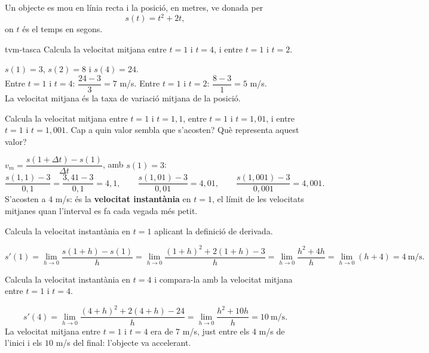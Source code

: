 Un objecte es mou en línia recta i la posició, en metres, ve donada per
\[
s(t)=t^2+2t ,
\]
on $t$ és el temps en segons.

\begin{apartats}

\begin{tria}{tvm-tasca}
Calcula la velocitat mitjana entre $t=1$ i $t=4$, i entre $t=1$ i $t=2$.

\begin{solucio}
$s(1)=3$, $s(2)=8$ i $s(4)=24$.\\
Entre $t=1$ i $t=4$: $\dfrac{24-3}{3}=7$ m/s. \quad Entre $t=1$ i $t=2$:
$\dfrac{8-3}{1}=5$ m/s.\\
La velocitat mitjana és la taxa de variació mitjana de la posició.
\end{solucio}

Calcula la velocitat mitjana entre $t=1$ i $t=1{,}1$, entre $t=1$ i $t=1{,}01$, i entre $t=1$ i
$t=1{,}001$. Cap a quin valor sembla que s'acosten? Què representa aquest valor?

\begin{solucio}
$v_m=\dfrac{s(1+\Delta t)-s(1)}{\Delta t}$, amb $s(1)=3$:
\[
\frac{s(1{,}1)-3}{0{,}1}=\frac{3{,}41-3}{0{,}1}=4{,}1,\qquad
\frac{s(1{,}01)-3}{0{,}01}=4{,}01,\qquad
\frac{s(1{,}001)-3}{0{,}001}=4{,}001 .
\]
S'acosten a $4$ m/s: és la \textbf{velocitat instantània} en $t=1$, el límit de les velocitats
mitjanes quan l'interval es fa cada vegada més petit.
\end{solucio}
\end{tria}

Calcula la velocitat instantània en $t=1$ aplicant la definició de derivada.

\begin{solucio}
\[
s'(1)=\lim_{h\to0}\frac{s(1+h)-s(1)}{h}
=\lim_{h\to0}\frac{(1+h)^2+2(1+h)-3}{h}
=\lim_{h\to0}\frac{h^2+4h}{h}=\lim_{h\to0}(h+4)=4 \ \text{m/s}.
\]
\end{solucio}

\begin{nomesllarg}
Calcula la velocitat instantània en $t=4$ i compara-la amb la velocitat mitjana entre $t=1$ i
$t=4$.

\begin{solucio}
\[
s'(4)=\lim_{h\to0}\frac{(4+h)^2+2(4+h)-24}{h}=\lim_{h\to0}\frac{h^2+10h}{h}=10 \ \text{m/s}.
\]
La velocitat mitjana entre $t=1$ i $t=4$ era de $7$ m/s, just entre els $4$ m/s de l'inici i
els $10$ m/s del final: l'objecte va accelerant.
\end{solucio}
\end{nomesllarg}

\end{apartats}
